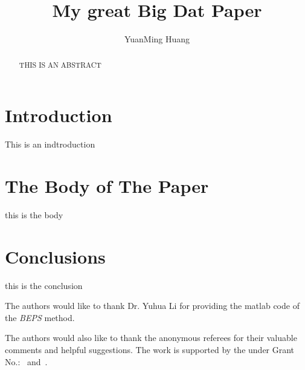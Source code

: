 \documentclass[sigconf]{acmart}
\begin{document}
\title{My great Big Dat Paper}


\author{YuanMing Huang}



\renewcommand{\shortauthors}{Y.HUANG}


\begin{abstract}
THIS IS AN ABSTRACT
\end{abstract}



\maketitle

\section{Introduction}

This is an indtroduction
\section{The Body of The Paper}

this is the body

\section{Conclusions}

this is the conclusion




\begin{acks}

  The authors would like to thank Dr. Yuhua Li for providing the
  matlab code of the \textit{BEPS} method.

  The authors would also like to thank the anonymous referees for
  their valuable comments and helpful suggestions. The work is
  supported by the  under Grant
  No.:~
  and~.

\end{acks}


 
\end{document}
